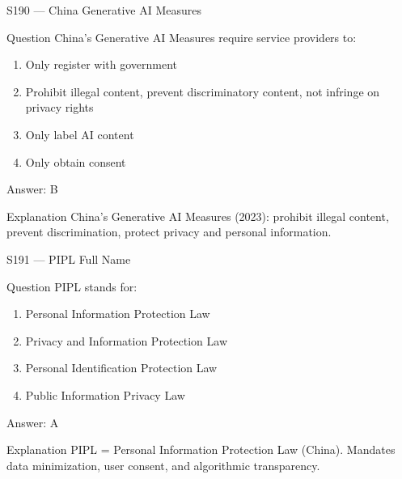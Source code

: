 \documentclass[aspectratio=169,8pt]{beamer}
\begin{document}
\begin{frame}{S190 --- China Generative AI Measures}
	\begin{block}{Question}
		China's Generative AI Measures require service providers to:
		\begin{enumerate}
			\item Only register with government
			\item Prohibit illegal content, prevent discriminatory content, not infringe on privacy rights
			\item Only label AI content
			\item Only obtain consent
		\end{enumerate}
	\end{block}
	\begin{exampleblock}{Answer: B}\end{exampleblock}
	\begin{block}{Explanation}
		China's Generative AI Measures (2023): prohibit illegal content, prevent discrimination, protect privacy and personal information.
	\end{block}
\end{frame}

\begin{frame}{S191 --- PIPL Full Name}
	\begin{block}{Question}
		PIPL stands for:
		\begin{enumerate}
			\item Personal Information Protection Law
			\item Privacy and Information Protection Law
			\item Personal Identification Protection Law
			\item Public Information Privacy Law
		\end{enumerate}
	\end{block}
	\begin{exampleblock}{Answer: A}\end{exampleblock}
	\begin{block}{Explanation}
		PIPL = Personal Information Protection Law (China). Mandates data minimization, user consent, and algorithmic transparency.
	\end{block}
\end{frame}
\end{document}
